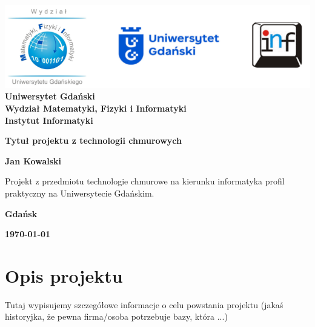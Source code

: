 \documentclass[12pt,a4paper]{article}
\newcommand{\hmwkTitle}{Tytuł projektu z technologii chmurowych} %
\newcommand{\hmwkDueDate}{\today} %
\newcommand{\hmwkAuthorName}{Jan Kowalski} %
\begin{document}
\begin{titlepage}
    \vfill
	\begin{center}
	\hspace*{-1cm}
	\vspace*{0.5cm}
    \includegraphics[scale=0.55]{imagens/loga.png}\\
	\textbf{Uniwersytet Gdański \\ [0.05cm]Wydział Matematyki, Fizyki i Informatyki \\ [0.05cm] Instytut Informatyki}

	\vspace{0.6cm}
	\vspace{4cm}
	{\huge \textbf{\hmwkTitle}}\vspace{8mm}
	
	{\large \textbf{\hmwkAuthorName}}\\[3cm]
	
		\hspace{.45\textwidth} %
	   \begin{minipage}{.5\textwidth}
	   Projekt z przedmiotu technologie chmurowe na kierunku informatyka profil praktyczny na Uniwersytecie Gdańskim.\\[0.1cm]
	  \end{minipage}
	  \vfill
	
	\textbf{Gdańsk}
	
	\textbf{\hmwkDueDate}
	\end{center}
	
\end{titlepage}

\newpage
\setcounter{secnumdepth}{5}
\tableofcontents
\newpage

\section{Opis projektu}
\label{sec:Project}

Tutaj wypisujemy szczegółowe informacje o celu powstania projektu (jakaś historyjka, że pewna firma/osoba potrzebuje bazy, która ...)
\end{document}
